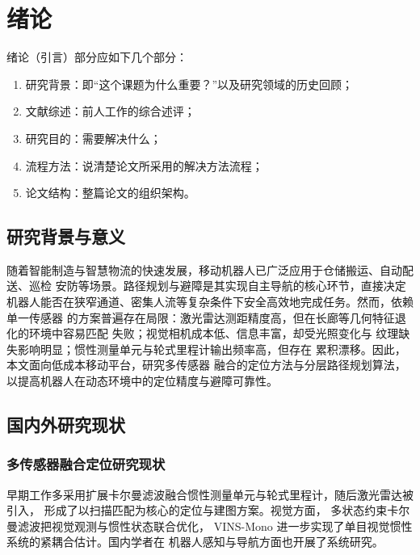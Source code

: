 \chapter{绪论}
绪论（引言）部分应如下几个部分：
\begin{enumerate}
  \item 研究背景：即“这个课题为什么重要？”以及研究领域的历史回顾；
  \item 文献综述：前人工作的综合述评；
  \item 研究目的：需要解决什么；
  \item 流程方法：说清楚论文所采用的解决方法流程；
  \item 论文结构：整篇论文的组织架构。
\end{enumerate}

\section{研究背景与意义}

随着智能制造与智慧物流的快速发展，移动机器人已广泛应用于仓储搬运、自动配送、巡检
安防等场景\cite{tan2013robot}。路径规划与避障是其实现自主导航的核心环节，直接决定
机器人能否在狭窄通道、密集人流等复杂条件下安全高效地完成任务。然而，依赖单一传感器
的方案普遍存在局限：激光雷达测距精度高，但在长廊等几何特征退化的环境中容易匹配
失败\cite{zhang2014loam,shan2018lego}；视觉相机成本低、信息丰富，却受光照变化与
纹理缺失影响明显\cite{qin2018vins}；惯性测量单元与轮式里程计输出频率高，但存在
累积漂移\cite{fox2005probabilistic}。因此，本文面向低成本移动平台，研究多传感器
融合的定位方法与分层路径规划算法，以提高机器人在动态环境中的定位精度与避障可靠性。

\section{国内外研究现状}

\subsection{多传感器融合定位研究现状}

早期工作多采用扩展卡尔曼滤波融合惯性测量单元与轮式里程计，随后激光雷达被引入，
形成了以扫描匹配为核心的定位与建图方案\cite{zhang2014loam,shan2018lego}。视觉方面，
多状态约束卡尔曼滤波把视觉观测与惯性状态联合优化\cite{mourikis2007msckf}，
VINS-Mono 进一步实现了单目视觉惯性系统的紧耦合估计\cite{qin2018vins}。国内学者在
机器人感知与导航方面也开展了系统研究\cite{tan2013robot,wang2004parallel}。

